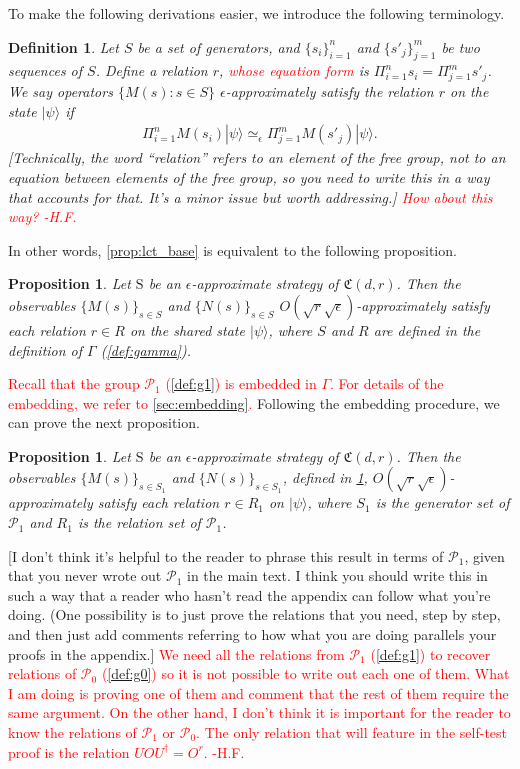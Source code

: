 \documentclass[11pt,letterpaper]{article}
\newcommand{\ket}[1]{|#1\rangle}
\newcommand{\ct}{^{\dagger}}
\newcommand{\1}{\mathbb{1}}
\newcommand{\Pg}{\mathcal{P}}
\newcommand{\fC}{\mathfrak{C}}
\newcommand{\bS}{\mathrm{S}}
\newcommand{\ep}{\epsilon}
\newcommand{\se}{\sqrt{\epsilon}}
\newcommand{\sr}{\sqrt{r}}
\newcommand{\appd}[1]{\simeq_{#1}}
\def\carl#1{{\color{blue} #1}}
\newcommand{\hf}[1]{\textcolor{red}{#1}}
\newcommand{\hfc}[1]{\textcolor{red}{#1 -H.F.}}
\newtheorem{proposition}[theorem]{Proposition}
\newtheorem{definition}[theorem]{Definition}
\theoremstyle{definition}
\begin{document}
To make the following derivations easier, we introduce the following terminology.
\begin{definition}
    Let $S$ be a set of generators, and $\{s_i\}_{i=1}^n$ and $\{s'_j\}_{j=1}^m$
    be two sequences of $S$.
    Define a relation $r$, \hf{whose equation form} is $\Pi_{i=1}^n s_i = \Pi_{j=1}^m s'_j$.
    We say operators $\{M(s) : s \in S\}$ $\ep$-approximately satisfy the relation
    $r$ on the state $\ket{\psi}$ if 
    \begin{align*}
        \Pi_{i=1}^n M(s_i)\ket{\psi} \appd{\ep} \Pi_{j=1}^m M(s'_j) \ket{\psi}. 
    \end{align*}
\carl{[Technically, the word ``relation'' refers to an element of the free group, not to an equation between elements of the free group, so you need to write this in a way that accounts for that.  It's a minor issue but worth addressing.]}
\hfc{How about this way?}
\end{definition}
In other words, \cref{prop:lct_base} is equivalent to the following proposition.
\begin{proposition}
    \label{prop:lct_group}
    Let $\bS$ be an $\ep$-approximate strategy of $\fC(d,r)$.
	Then the observables $\{ M(s) \}_{s \in S}$ and
	$\{N(s)\}_{s \in S}$ $O(\sr \se)$-approximately satisfy
	each relation $r \in R$ on the shared state $\ket{\psi}$, 
	where $S$ and $R$ are defined in the definition of $\Gamma$ 
	(\cref{def:gamma}).	
\end{proposition}
\hf{Recall that the group $\Pg_1$ (\cref{def:g1}) is embedded in $\Gamma$.  
For details of the embedding, we refer to \cref{sec:embedding}.}
Following the embedding procedure, we can prove the next proposition.
\begin{proposition}
    \label{prop:lct_pg1}
    Let $\bS$ be an $\ep$-approximate strategy of $\fC(d,r)$.
	Then the observables $\{ M(s) \}_{s \in S_1}$ and
	$\{N(s)\}_{s \in S_1}$, defined in 
\cref{prop:lct_group}, $O(\sr\se)$-approximately satisfy
	each relation $r \in R_1$ on $\ket{\psi}$, 
	where $S_1$ is the generator set of $\Pg_1$
    and $R_1$ is the relation set of $\Pg_1$.	
\end{proposition}

\carl{[I don't think it's helpful
to the reader to phrase this result in terms of $\Pg_1$, given that you never wrote out $\Pg_1$ in the main text.  I think you should write this in such a way that a reader who hasn't read the appendix can follow what you're doing.  (One possibility is to just prove the relations that you need, step by step, and then just add comments referring to how what you are doing parallels your proofs in the appendix.]}
\hfc{We need all the relations from $\Pg_1$ (\cref{def:g1}) to recover relations of $\Pg_0$ (\cref{def:g0})
so it is not possible to write out each one of them. 
What I am doing is proving one of them and comment that the rest of them require the same argument.
On the other hand, I don't think it is important for the reader to know the relations of $\Pg_1$
or $\Pg_0$. The only relation that will feature in the self-test proof is the relation $UOU\ct = O^r$.}
\end{document}
